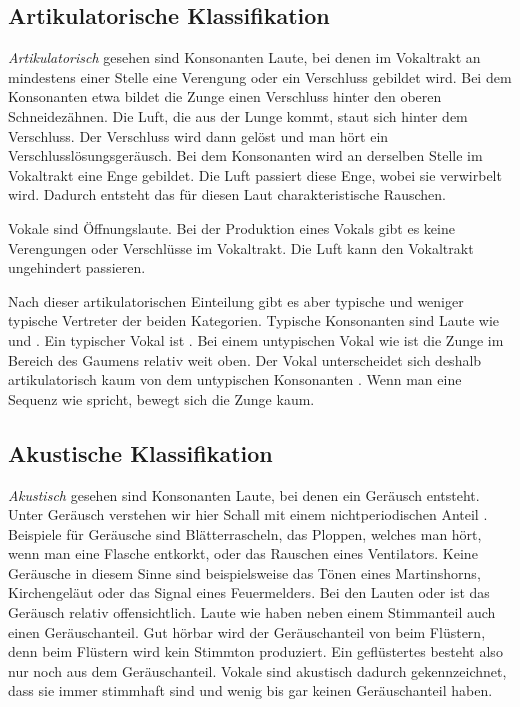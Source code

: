 \subsection{Artikulatorische Klassifikation}
\textit{Artikulatorisch} gesehen sind Konsonanten Laute, bei denen im Vokaltrakt an mindestens einer Stelle eine Verengung oder ein Verschluss gebildet wird. Bei dem Konsonanten \textipa{[t]} etwa bildet die Zunge einen Verschluss hinter den oberen Schneidezähnen. Die Luft, die aus der Lunge kommt, staut sich hinter dem Verschluss. Der Verschluss wird dann gelöst und man hört ein Verschlusslösungsgeräusch. Bei dem Konsonanten \textipa{[s]} wird an derselben Stelle im Vokaltrakt eine Enge gebildet. Die Luft passiert diese Enge, wobei sie verwirbelt wird. Dadurch entsteht das für diesen Laut charakteristische Rauschen.


Vokale sind Öffnungslaute. Bei der Produktion eines Vokals gibt es keine Verengungen oder Verschlüsse im Vokaltrakt. Die Luft kann den Vokaltrakt ungehindert passieren. 

Nach dieser artikulatorischen Einteilung gibt es aber typische und weniger typische Vertreter der beiden Kategorien. Typische Konsonanten sind Laute wie \textipa{[s]} und \textipa{[p]}. Ein typischer Vokal ist \textipa{[a]}. Bei einem untypischen Vokal wie \textipa{[i]} ist die Zunge im Bereich des Gaumens relativ weit oben. Der Vokal \textipa{[i]} unterscheidet sich deshalb artikulatorisch kaum von dem untypischen Konsonanten \textipa{[j]}. Wenn man eine Sequenz wie \textipa{[jiji]} spricht, bewegt sich die Zunge kaum.

\subsection{Akustische Klassifikation}
\textit{Akustisch} gesehen sind Konsonanten Laute, bei denen ein Geräusch entsteht. Unter Geräusch verstehen wir hier Schall mit einem nichtperiodischen Anteil \citep[Kap. 7--9]{Johnson:2003}. Beispiele für Geräusche sind Blätterrascheln, das Ploppen, welches man hört, wenn man eine Flasche entkorkt, oder das Rauschen eines Ventilators. Keine Geräusche in diesem Sinne sind beispielsweise das Tönen eines Martinshorns, Kirchengeläut oder das Signal eines Feuermelders. Bei den Lauten \textipa{[s]} oder \textipa{[p]} ist das Geräusch relativ offensichtlich. Laute wie \textipa{[l]} haben neben einem Stimmanteil auch einen Geräuschanteil. Gut hörbar wird der Geräuschanteil von \textipa{[l]} beim Flüstern, denn beim Flüstern wird kein Stimmton produziert. Ein geflüstertes \textipa{[l]} besteht also nur noch aus dem Geräuschanteil. Vokale sind akustisch dadurch gekennzeichnet, dass sie immer stimmhaft sind und wenig bis gar keinen Geräuschanteil haben. 


